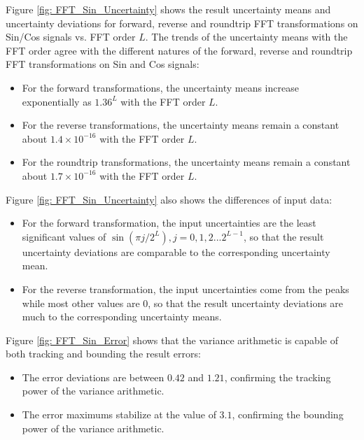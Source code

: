 \documentclass[twoside]{article}
\numberwithin{equation}{section}
\begin{document}
Figure \ref{fig: FFT_Sin_Uncertainty} shows the result uncertainty means and uncertainty deviations for forward, reverse and roundtrip FFT transformations on Sin/Cos signals vs. FFT order $L$.
The trends of the uncertainty means with the FFT order agree with the different natures of the forward, reverse and roundtrip FFT transformations on Sin and Cos signals:
\begin{itemize}
\item For the forward transformations, the uncertainty means increase exponentially as $1.36^L$ with the FFT order $L$.

\item For the reverse transformations, the uncertainty means remain a constant about $1.4 \times 10^{-16}$ with the FFT order $L$.

\item For the roundtrip transformations, the uncertainty means remain a constant about $1.7 \times 10^{-16}$ with the FFT order $L$.
\end{itemize}
Figure \ref{fig: FFT_Sin_Uncertainty} also shows the differences of input data:
\begin{itemize}
\item For the forward transformation, the input uncertainties are the least significant values of $\sin(\pi j /2^L), j = 0, 1, 2 ... 2^{L-1}$, so that the result uncertainty deviations are comparable to the corresponding uncertainty mean.

\item For the reverse transformation, the input uncertainties come from the peaks while most other values are $0$, so that the result uncertainty deviations are much to the corresponding uncertainty means.
\end{itemize}

Figure \ref{fig: FFT_Sin_Error} shows that the variance arithmetic is capable of both tracking and bounding the result errors:
\begin{itemize}
\item The error deviations are between $0.42$ and $1.21$, confirming the tracking power of the variance arithmetic.

\item The error maximums stabilize at the value of $3.1$, confirming the bounding power of the variance arithmetic.
\end{itemize}
\end{document}
